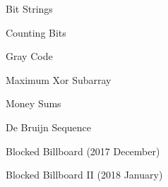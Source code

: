 \begin{practice}
\begin{pplist}
  \item Bit Strings
  \item Counting Bits
  \item Gray Code
  \item Maximum Xor Subarray
  \item Money Sums
  \item De Bruijn Sequence
\end{pplist}
\begin{pplist}[2]
  \item Blocked Billboard (2017 December)
  \item Blocked Billboard II (2018 January)
\end{pplist}
\end{practice}
